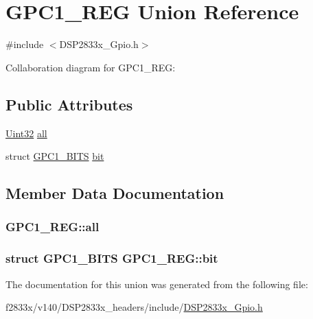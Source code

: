 \hypertarget{union_g_p_c1___r_e_g}{}\section{G\+P\+C1\+\_\+\+R\+E\+G Union Reference}
\label{union_g_p_c1___r_e_g}


{\ttfamily \#include $<$D\+S\+P2833x\+\_\+\+Gpio.\+h$>$}



Collaboration diagram for G\+P\+C1\+\_\+\+R\+E\+G\+:
\subsection*{Public Attributes}
\begin{DoxyCompactItemize}
\item 
\hyperlink{_d_s_p2833x___device_8h_aba99025e657f892beb7ff31cecf64653}{Uint32} \hyperlink{union_g_p_c1___r_e_g_a29d7f3a2ef932bf81b3291ea7bc0e62e}{all}
\item 
struct \hyperlink{struct_g_p_c1___b_i_t_s}{G\+P\+C1\+\_\+\+B\+I\+T\+S} \hyperlink{union_g_p_c1___r_e_g_aafad30427069a5ce203afbc1625f42d3}{bit}
\end{DoxyCompactItemize}


\subsection{Member Data Documentation}
\hypertarget{union_g_p_c1___r_e_g_a29d7f3a2ef932bf81b3291ea7bc0e62e}{}
\subsubsection[{all}]{ G\+P\+C1\+\_\+\+R\+E\+G\+::all}\label{union_g_p_c1___r_e_g_a29d7f3a2ef932bf81b3291ea7bc0e62e}
\hypertarget{union_g_p_c1___r_e_g_aafad30427069a5ce203afbc1625f42d3}{}
\subsubsection[{bit}]{\setlength{\rightskip}{0pt plus 5cm}struct {\bf G\+P\+C1\+\_\+\+B\+I\+T\+S} G\+P\+C1\+\_\+\+R\+E\+G\+::bit}\label{union_g_p_c1___r_e_g_aafad30427069a5ce203afbc1625f42d3}


The documentation for this union was generated from the following file\+:\begin{DoxyCompactItemize}
\item 
f2833x/v140/\+D\+S\+P2833x\+\_\+headers/include/\hyperlink{_d_s_p2833x___gpio_8h}{D\+S\+P2833x\+\_\+\+Gpio.\+h}\end{DoxyCompactItemize}
